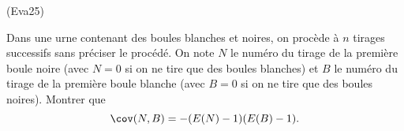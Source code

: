 \begin{tiny}(Eva25)\end{tiny} Dans une urne contenant des boules blanches et noires, on procède à $n$ tirages successifs sans préciser le procédé. On note $N$ le numéro du tirage de la première boule noire (avec $N=0$ si on ne tire que des boules blanches) et $B$ le numéro du tirage de la première boule blanche (avec $B=0$ si on ne tire que des boules noires). Montrer que
\[
 \cov(N,B) = -(E(N)-1)(E(B)-1).
\]
